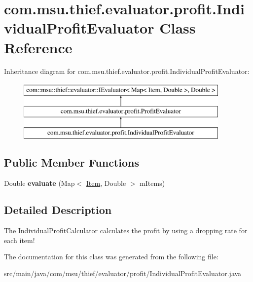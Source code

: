 \hypertarget{classcom_1_1msu_1_1thief_1_1evaluator_1_1profit_1_1IndividualProfitEvaluator}{\section{com.\-msu.\-thief.\-evaluator.\-profit.\-Individual\-Profit\-Evaluator Class Reference}
\label{classcom_1_1msu_1_1thief_1_1evaluator_1_1profit_1_1IndividualProfitEvaluator}
}
Inheritance diagram for com.\-msu.\-thief.\-evaluator.\-profit.\-Individual\-Profit\-Evaluator\-:\begin{figure}[H]
\begin{center}
\leavevmode
\includegraphics[height=3.000000cm]{classcom_1_1msu_1_1thief_1_1evaluator_1_1profit_1_1IndividualProfitEvaluator}
\end{center}
\end{figure}
\subsection*{Public Member Functions}
\begin{DoxyCompactItemize}
\item 
\hypertarget{classcom_1_1msu_1_1thief_1_1evaluator_1_1profit_1_1IndividualProfitEvaluator_add7fe39c2f4e010d8f0dbe204b5aaf57}{Double {\bfseries evaluate} (Map$<$ \hyperlink{classcom_1_1msu_1_1thief_1_1model_1_1Item}{Item}, Double $>$ m\-Items)}\label{classcom_1_1msu_1_1thief_1_1evaluator_1_1profit_1_1IndividualProfitEvaluator_add7fe39c2f4e010d8f0dbe204b5aaf57}

\end{DoxyCompactItemize}


\subsection{Detailed Description}
The Individual\-Profit\-Calculator calculates the profit by using a dropping rate for each item! 

The documentation for this class was generated from the following file\-:\begin{DoxyCompactItemize}
\item 
src/main/java/com/msu/thief/evaluator/profit/Individual\-Profit\-Evaluator.\-java\end{DoxyCompactItemize}
